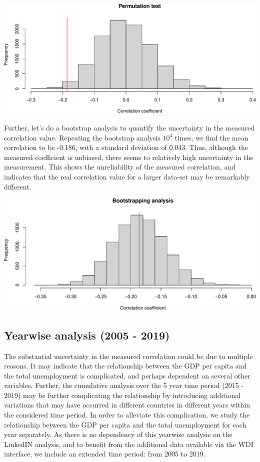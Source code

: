 \documentclass[
]{article}
\begin{document}
\includegraphics{main_files/figure-latex/permutation_plot-1.pdf}

Further, let's do a bootstrap analysis to quantify the uncertainty in
the measured correlation value. Repeating the bootstrap analysis
\ensuremath{10^{4}} times, we find the mean correlation to be -0.186,
with a standard deviation of 0.043. Thus, although the measured
coefficient is unbiased, there seems to relatively high uncertainty in
the measurement. This shows the unreliability of the measured
correlation, and indicates that the real correlation value for a larger
data-set may be remarkably different.

\includegraphics{main_files/figure-latex/unnamed-chunk-8-1.pdf}

\hypertarget{yearwise-analysis-2005---2019}{%
\subsection{Yearwise analysis (2005 -
2019)}\label{yearwise-analysis-2005---2019}}

The substantial uncertainty in the measured correlation could be due to
multiple reasons. It may indicate that the relationship between the GDP
per capita and the total unemployment is complicated, and perhaps
dependent on several other variables. Further, the cumulative analysis
over the 5 year time period (2015 - 2019) may be further complicating
the relationship by introducing additional variations that may have
occurred in different countries in different years within the considered
time period. In order to alleviate this complication, we study the
relationship between the GDP per capita and the total unemployment for
each year separately. As there is no dependency of this yearwise
analysis on the LinkedIN analysis, and to benefit from the additional
data available via the WDI interface, we include an extended time
period: from 2005 to 2019.
\end{document}
